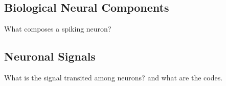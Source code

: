 \subsection{Biological Neural Components}
What composes a spiking neuron?
%



\subsection{Neuronal Signals}

What is the signal transited among neurons?
and what are the codes.


